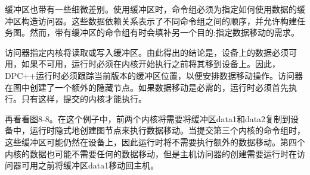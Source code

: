 缓冲区也带有一些细微差别。使用缓冲区时，命令组必须为指定如何使用数据的缓冲区构造访问器。这些数据依赖关系表示了不同命令组之间的顺序，并允许构建任务图。然而，带有缓冲区的命令组有时会填补另一个目的:指定数据移动的需求。\par

访问器指定内核将读取或写入缓冲区。由此得出的结论是，设备上的数据必须可用，如果不可用，运行时必须在内核开始执行之前将其移到设备上。因此，DPC++运行时必须跟踪当前版本的缓冲区位置，以便安排数据移动操作。访问器在图中创建了一个额外的隐藏节点。如果数据移动是必需的，运行时必须首先执行。只有这样，提交的内核才能执行。\par

再看看图8-8。在这个例子中，前两个内核将需要将缓冲区data1和data2复制到设备中，运行时隐式地创建图节点来执行数据移动。当提交第三个内核的命令组时，这些缓冲区可能仍然在设备上，因此运行时将不需要执行额外的数据移动。第四个内核的数据也可能不需要任何的数据移动，但是主机访问器的创建需要运行时在访问器可用之前将缓冲区data1移动回主机。\par



























































